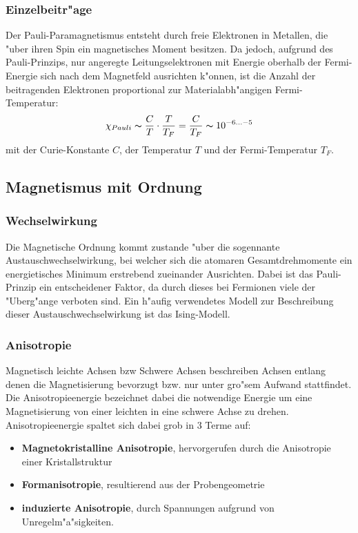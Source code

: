             \subsubsection*{Einzelbeitr"age}
            Der Pauli-Paramagnetismus entsteht durch freie Elektronen in Metallen, die "uber ihren Spin
            ein magnetisches Moment besitzen. Da jedoch, aufgrund des Pauli-Prinzips, nur angeregte
            Leitungselektronen mit Energie oberhalb der Fermi-Energie sich nach dem Magnetfeld ausrichten k"onnen,
            ist die Anzahl der beitragenden Elektronen proportional zur Materialabh"angigen Fermi-Temperatur:
            \begin{equation}
                \chi_{Pauli} \thicksim \frac{C}{T} \cdot \frac{T}{T_{F}} = \frac{C}{T_F}\thicksim 10^{-6 ... -5}
            \end{equation}
            mit der Curie-Konstante $C$, der Temperatur $T$ und der Fermi-Temperatur $T_F$.


    \subsection{Magnetismus mit Ordnung}
        \subsubsection*{Wechselwirkung}
            Die Magnetische Ordnung kommt zustande "uber die sogennante Austauschwechselwirkung, bei welcher sich
            die atomaren Gesamtdrehmomente ein energietisches Minimum erstrebend zueinander Ausrichten. Dabei ist
            das Pauli-Prinzip ein entscheidener Faktor, da durch dieses bei Fermionen viele der "Uberg"ange verboten sind.
            Ein h"aufig verwendetes Modell zur Beschreibung dieser Austauschwechselwirkung ist das Ising-Modell.
        \subsubsection*{Anisotropie}
            Magnetisch leichte Achsen bzw Schwere Achsen beschreiben Achsen entlang denen die Magnetisierung bevorzugt
            bzw. nur unter gro"sem Aufwand stattfindet. Die Anisotropieenergie bezeichnet dabei die notwendige Energie
            um eine Magnetisierung von einer leichten in eine schwere Achse zu drehen.\\
            Anisotropieenergie spaltet sich dabei grob in 3 Terme auf:
            \begin{itemize}
                \item \textbf{Magnetokristalline Anisotropie}, hervorgerufen durch die Anisotropie einer Kristallstruktur
                \item \textbf{Formanisotropie}, resultierend aus der Probengeometrie
                \item \textbf{induzierte Anisotropie}, durch Spannungen aufgrund von Unregelm"a"sigkeiten.
            \end{itemize}
